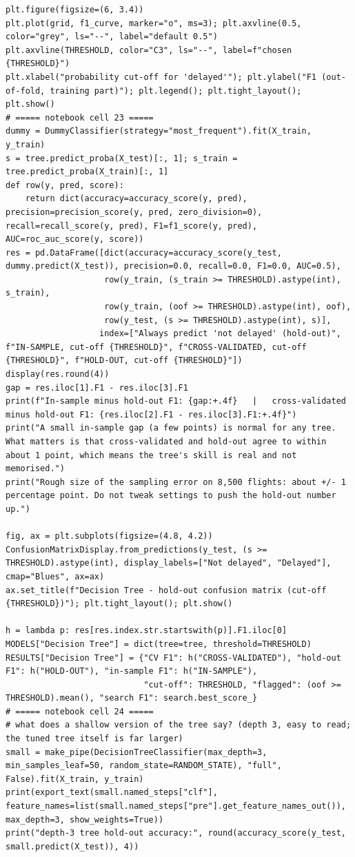 \documentclass[12pt,a4paper]{article}
\begin{document}
\begin{lstlisting}[style=code]
plt.figure(figsize=(6, 3.4))
plt.plot(grid, f1_curve, marker="o", ms=3); plt.axvline(0.5, color="grey", ls="--", label="default 0.5")
plt.axvline(THRESHOLD, color="C3", ls="--", label=f"chosen {THRESHOLD}")
plt.xlabel("probability cut-off for 'delayed'"); plt.ylabel("F1 (out-of-fold, training part)"); plt.legend(); plt.tight_layout(); plt.show()
# ===== notebook cell 23 =====
dummy = DummyClassifier(strategy="most_frequent").fit(X_train, y_train)
s = tree.predict_proba(X_test)[:, 1]; s_train = tree.predict_proba(X_train)[:, 1]
def row(y, pred, score):
    return dict(accuracy=accuracy_score(y, pred), precision=precision_score(y, pred, zero_division=0), recall=recall_score(y, pred), F1=f1_score(y, pred), AUC=roc_auc_score(y, score))
res = pd.DataFrame([dict(accuracy=accuracy_score(y_test, dummy.predict(X_test)), precision=0.0, recall=0.0, F1=0.0, AUC=0.5),
                    row(y_train, (s_train >= THRESHOLD).astype(int), s_train),
                    row(y_train, (oof >= THRESHOLD).astype(int), oof),
                    row(y_test, (s >= THRESHOLD).astype(int), s)],
                   index=["Always predict 'not delayed' (hold-out)", f"IN-SAMPLE, cut-off {THRESHOLD}", f"CROSS-VALIDATED, cut-off {THRESHOLD}", f"HOLD-OUT, cut-off {THRESHOLD}"])
display(res.round(4))
gap = res.iloc[1].F1 - res.iloc[3].F1
print(f"In-sample minus hold-out F1: {gap:+.4f}   |   cross-validated minus hold-out F1: {res.iloc[2].F1 - res.iloc[3].F1:+.4f}")
print("A small in-sample gap (a few points) is normal for any tree. What matters is that cross-validated and hold-out agree to within about 1 point, which means the tree's skill is real and not memorised.")
print("Rough size of the sampling error on 8,500 flights: about +/- 1 percentage point. Do not tweak settings to push the hold-out number up.")

fig, ax = plt.subplots(figsize=(4.8, 4.2))
ConfusionMatrixDisplay.from_predictions(y_test, (s >= THRESHOLD).astype(int), display_labels=["Not delayed", "Delayed"], cmap="Blues", ax=ax)
ax.set_title(f"Decision Tree - hold-out confusion matrix (cut-off {THRESHOLD})"); plt.tight_layout(); plt.show()

h = lambda p: res[res.index.str.startswith(p)].F1.iloc[0]
MODELS["Decision Tree"] = dict(tree=tree, threshold=THRESHOLD)
RESULTS["Decision Tree"] = {"CV F1": h("CROSS-VALIDATED"), "hold-out F1": h("HOLD-OUT"), "in-sample F1": h("IN-SAMPLE"),
                            "cut-off": THRESHOLD, "flagged": (oof >= THRESHOLD).mean(), "search F1": search.best_score_}
# ===== notebook cell 24 =====
# what does a shallow version of the tree say? (depth 3, easy to read; the tuned tree itself is far larger)
small = make_pipe(DecisionTreeClassifier(max_depth=3, min_samples_leaf=50, random_state=RANDOM_STATE), "full", False).fit(X_train, y_train)
print(export_text(small.named_steps["clf"], feature_names=list(small.named_steps["pre"].get_feature_names_out()), max_depth=3, show_weights=True))
print("depth-3 tree hold-out accuracy:", round(accuracy_score(y_test, small.predict(X_test)), 4))
\end{lstlisting}
\end{document}
